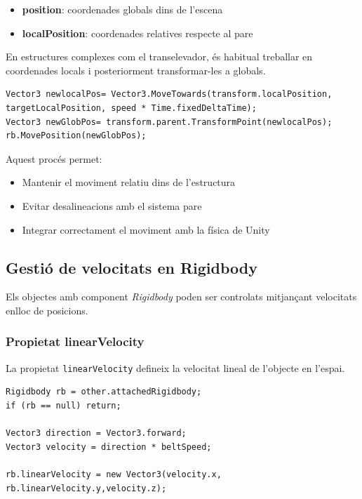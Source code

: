 \documentclass[12pt,a4paper]{report}
\begin{document}
\begin{itemize}
\item \textbf{position}: coordenades globals dins de l'escena
\item \textbf{localPosition}: coordenades relatives respecte al pare
\end{itemize}

En estructures complexes com el transelevador, és habitual treballar en coordenades locals i posteriorment transformar-les a globals.

\begin{lstlisting}[language=CSharp]
Vector3 newlocalPos= Vector3.MoveTowards(transform.localPosition, targetLocalPosition, speed * Time.fixedDeltaTime);
Vector3 newGlobPos= transform.parent.TransformPoint(newlocalPos);
rb.MovePosition(newGlobPos);
\end{lstlisting}

Aquest procés permet:

\begin{itemize}
\item Mantenir el moviment relatiu dins de l'estructura
\item Evitar desalineacions amb el sistema pare
\item Integrar correctament el moviment amb la física de Unity
\end{itemize}


\subsection{Gestió de velocitats en Rigidbody}

Els objectes amb component \textit{Rigidbody} \cite{UnityRigidbody} poden ser controlats mitjançant velocitats enlloc de posicions.

\subsubsection{Propietat linearVelocity}

La propietat \texttt{linearVelocity} defineix la velocitat lineal de l'objecte en l'espai.

\begin{lstlisting}[language=CSharp]
Rigidbody rb = other.attachedRigidbody;
if (rb == null) return;

Vector3 direction = Vector3.forward;
Vector3 velocity = direction * beltSpeed;

rb.linearVelocity = new Vector3(velocity.x, rb.linearVelocity.y,velocity.z);
\end{lstlisting}
\end{document}
